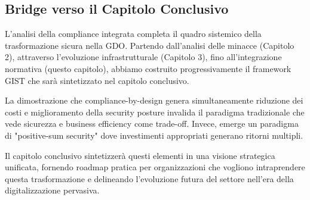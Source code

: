 \subsection{Bridge verso il Capitolo Conclusivo}

L'analisi della compliance integrata completa il quadro sistemico della trasformazione sicura nella GDO. Partendo dall'analisi delle minacce (Capitolo 2), attraverso l'evoluzione infrastrutturale (Capitolo 3), fino all'integrazione normativa (questo capitolo), abbiamo costruito progressivamente il framework GIST che sarà sintetizzato nel capitolo conclusivo.

La dimostrazione che compliance-by-design genera simultaneamente riduzione dei costi e miglioramento della security posture invalida il paradigma tradizionale che vede sicurezza e business efficiency come trade-off. Invece, emerge un paradigma di "positive-sum security" dove investimenti appropriati generano ritorni multipli.

Il capitolo conclusivo sintetizzerà questi elementi in una visione strategica unificata, fornendo roadmap pratica per organizzazioni che vogliono intraprendere questa trasformazione e delineando l'evoluzione futura del settore nell'era della digitalizzazione pervasiva.